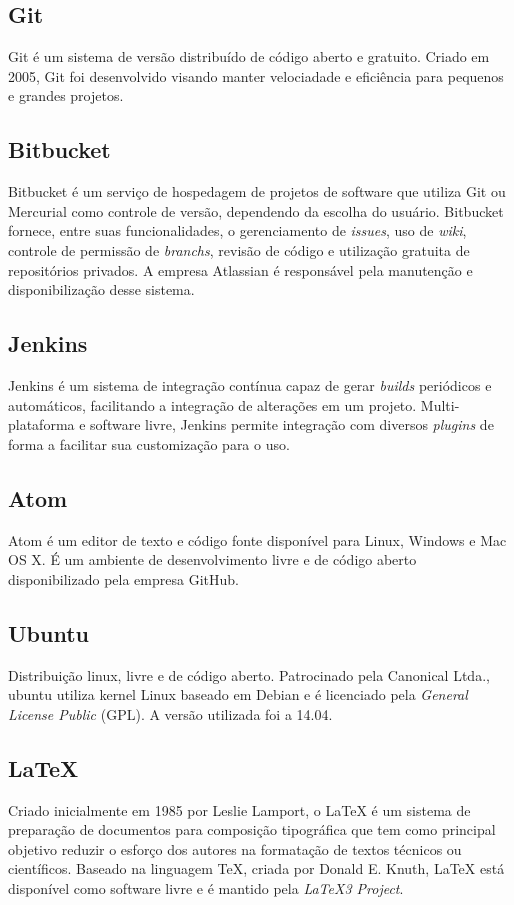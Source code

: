 \subsection{Git}
Git é um sistema de versão distribuído de código aberto e gratuito. Criado em 2005, Git foi desenvolvido visando manter velociadade e eficiência para pequenos e grandes projetos. 

\subsection{Bitbucket}
Bitbucket é um serviço de hospedagem de projetos de software que utiliza Git ou Mercurial como controle de versão, dependendo da escolha do usuário. Bitbucket fornece, entre suas funcionalidades, o gerenciamento de \textit{issues}, uso de \textit{wiki}, controle de permissão de \textit{branchs}, revisão de código e utilização gratuita de repositórios privados. A empresa Atlassian é responsável pela manutenção e disponibilização desse sistema.

\subsection{Jenkins}
Jenkins é um sistema de integração contínua capaz de gerar \textit{builds} periódicos e automáticos, facilitando a integração de alterações em um projeto. Multi-plataforma e software livre, Jenkins permite integração com diversos \textit{plugins} de forma a facilitar sua customização para o uso.

\subsection{Atom}
Atom é um editor de texto e código fonte disponível para Linux, Windows e Mac OS X. É um ambiente de desenvolvimento livre e de código aberto disponibilizado pela empresa GitHub. 

\subsection{Ubuntu}
Distribuição linux, livre e de código aberto. Patrocinado pela Canonical Ltda., ubuntu utiliza kernel Linux baseado em Debian e é licenciado pela \textit{General License Public} (GPL). A versão utilizada foi a 14.04.  

\subsection{LaTeX}
Criado inicialmente em 1985 por Leslie Lamport, o LaTeX é um sistema de preparação de documentos para composição tipográfica que tem como principal objetivo reduzir o esforço dos autores na formatação de textos técnicos ou científicos. Baseado na linguagem TeX, criada por Donald E. Knuth, LaTeX está disponível como software livre e é mantido pela \textit{LaTeX3 Project}.

